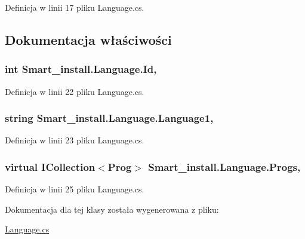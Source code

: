 Definicja w linii 17 pliku Language.\+cs.



\subsection{Dokumentacja właściwości}
\hypertarget{class_smart__install_1_1_language_a38247b2fb0320ba0e0a70efab8927dd3}{
\subsubsection[{Id}]{\setlength{\rightskip}{0pt plus 5cm}int Smart\+\_\+install.\+Language.\+Id\hspace{0.3cm}{\ttfamily [get]}, {\ttfamily [set]}}}\label{class_smart__install_1_1_language_a38247b2fb0320ba0e0a70efab8927dd3}


Definicja w linii 22 pliku Language.\+cs.

\hypertarget{class_smart__install_1_1_language_a49c0c02bcda046b771c222941569927a}{
\subsubsection[{Language1}]{\setlength{\rightskip}{0pt plus 5cm}string Smart\+\_\+install.\+Language.\+Language1\hspace{0.3cm}{\ttfamily [get]}, {\ttfamily [set]}}}\label{class_smart__install_1_1_language_a49c0c02bcda046b771c222941569927a}


Definicja w linii 23 pliku Language.\+cs.

\hypertarget{class_smart__install_1_1_language_a23f806e2c30c3b9eae478ad27fc53123}{
\subsubsection[{Progs}]{\setlength{\rightskip}{0pt plus 5cm}virtual I\+Collection$<${\bf Prog}$>$ Smart\+\_\+install.\+Language.\+Progs\hspace{0.3cm}{\ttfamily [get]}, {\ttfamily [set]}}}\label{class_smart__install_1_1_language_a23f806e2c30c3b9eae478ad27fc53123}


Definicja w linii 25 pliku Language.\+cs.



Dokumentacja dla tej klasy została wygenerowana z pliku\+:\begin{DoxyCompactItemize}
\item 
\hyperlink{_language_8cs}{Language.\+cs}\end{DoxyCompactItemize}
